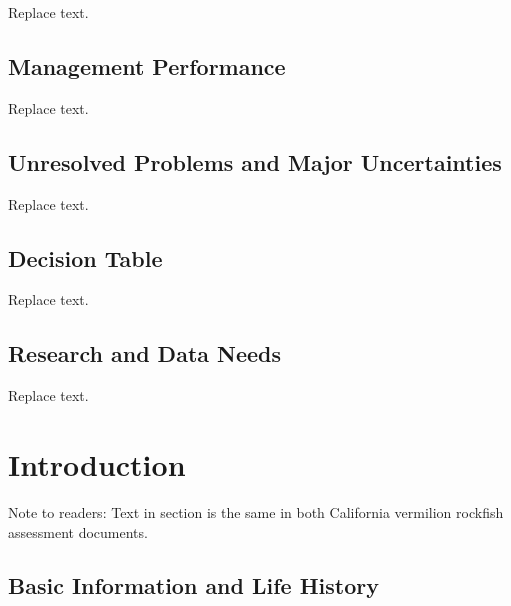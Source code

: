\documentclass[
  english,
  a4paper,
]{article}
\begin{document}
Replace text.

\hypertarget{management-performance}{%
\subsection*{Management Performance}\label{management-performance}}

Replace text.

\hypertarget{unresolved-problems-and-major-uncertainties}{%
\subsection*{Unresolved Problems and Major Uncertainties}\label{unresolved-problems-and-major-uncertainties}}

Replace text.

\hypertarget{decision-table}{%
\subsection*{Decision Table}\label{decision-table}}

Replace text.

\hypertarget{research-and-data-needs}{%
\subsection*{Research and Data Needs}\label{research-and-data-needs}}

Replace text.

\pagebreak
\setlength{\parskip}{5mm plus1mm minus1mm}
\setcounter{page}{1}
\renewcommand{\thefigure}{\arabic{figure}}
\renewcommand{\thetable}{\arabic{table}}
\setcounter{table}{0}
\setcounter{figure}{0}

\hypertarget{introduction}{%
\section{Introduction}\label{introduction}}

Note to readers: Text in section is the same in both California vermilion rockfish assessment
documents.

\hypertarget{basic-information-and-life-history}{%
\subsection{Basic Information and Life History}\label{basic-information-and-life-history}}
\end{document}
